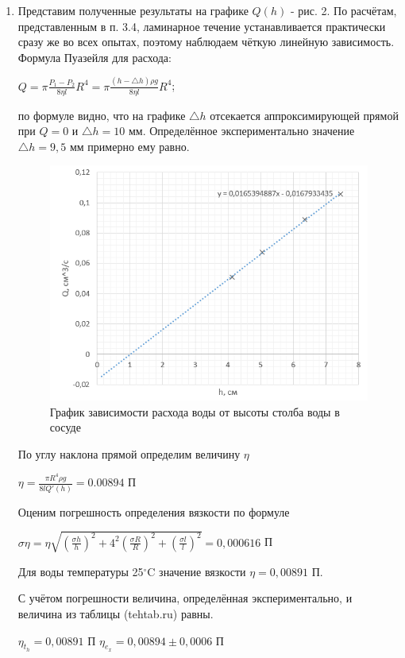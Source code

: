 \documentclass[a4paper]{article}
\begin{document}
\begin{enumerate}
    \item Представим полученные результаты на графике $Q(h)$ - рис. 2. По расчётам, представленным в п. 3.4, ламинарное течение устанавливается практически сразу же во всех опытах, поэтому наблюдаем чёткую линейную зависимость. Формула Пуазейля для расхода:
    \begin{center}
    $Q = \pi \frac{P_1-P_2}{8 \eta l} R^4 = \pi \frac{(h - \triangle h)\rho g}{8 \eta l} R^4$;
    \end{center}
    по формуле видно, что на графике $\triangle h$ отсекается аппроксимирующей прямой при $Q = 0$ и $\triangle h = 10$ мм. Определённое экспериментально значение $\triangle h = 9,5$ мм примерно ему равно.
    
    \begin{figure}[t]
    \centering
    \includegraphics[width=\textwidth]{graph1.PNG}
    \caption{График зависимости расхода воды от высоты столба воды в сосуде}
    \label{fig:vac}
    \end{figure}
    
    По углу наклона прямой определим величину $\eta$
    \begin{center}
    $\eta = \frac{\pi R^4 \rho g}{8 l Q'(h)} = 0.00894$ П
    \end{center}
    
    Оценим погрешность определения вязкости по формуле
    \begin{center}
    $\sigma \eta = \eta \sqrt{(\frac{\sigma h}{h})^2 + 4^2(\frac{\sigma R}{R})^2 + (\frac{\sigma l}{l})^2} = 0,000616$ П
    \end{center}
    
    Для воды температуры 25$^{\circ} $C значение вязкости $\eta = 0,00891$ П. \par
    С учётом погрешности величина, определённая экспериментально, и величина из таблицы (tehtab.ru)  равны.
    
    \begin{center}
    \fbox
    {$\eta_t_h = 0,00891$ П \hspace{1cm} $\eta_e_x = 0,00894 \pm 0,0006$ П}
    \end{center}

    
\end{enumerate}
\end{document}
